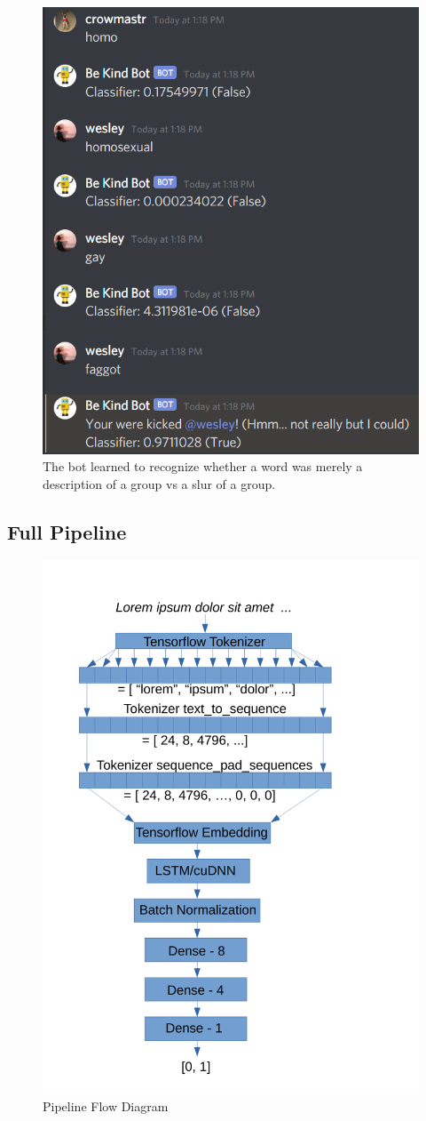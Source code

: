 \documentclass[conference]{sig-alternate-05-2015}
\begin{document}
\begin{figure}
	\centering
	\includegraphics[width=0.8\linewidth]{"chatBot"}
	\caption{The bot learned to recognize whether a word was merely a description of a group vs a slur of a group.}
	\label{fig:Chat Bot Test}
\end{figure}

\subsection{Full Pipeline}

\begin{figure}
	\centering
	\includegraphics[width=0.8\linewidth]{"pipeline"}
	\caption{Pipeline Flow Diagram}
	\label{fig:pipeline}
\end{figure}
\end{document}
